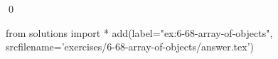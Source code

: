
\begin{ex}
  \label{ex:6-68-array-of-objects}
  
  \qed
\end{ex}
\begin{python0}
from solutions import *
add(label="ex:6-68-array-of-objects",
    srcfilename='exercises/6-68-array-of-objects/answer.tex')
\end{python0}

